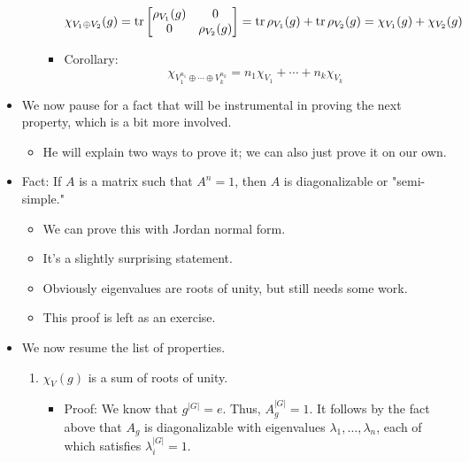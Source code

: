 \documentclass[../notes.tex]{subfiles}
\begin{document}
\begin{itemize}
\begin{enumerate}
\begin{itemize}
            \begin{equation*}
                \chi_{V_1\oplus V_2}(g) = \tr
                \begin{bmatrix}
                    \rho_{V_1}(g) & 0\\
                    0 & \rho_{V_2}(g)\\
                \end{bmatrix}
                = \tr\rho_{V_1}(g)+\tr\rho_{V_2}(g)
                = \chi_{V_1}(g)+\chi_{V_2}(g)
            \end{equation*}
            \item Corollary:
            \begin{equation*}
                \chi_{V_1^{n_1}\oplus\cdots\oplus V_k^{n_k}} = n_1\chi_{V_1}+\cdots+n_k\chi_{V_k}
            \end{equation*}
        \end{itemize}
    \end{enumerate}
    \item We now pause for a fact that will be instrumental in proving the next property, which is a bit more involved.
    \begin{itemize}
        \item He will explain two ways to prove it; we can also just prove it on our own.
    \end{itemize}
    \item Fact: If $A$ is a matrix such that $A^n=1$, then $A$ is diagonalizable or "semi-simple."
    \begin{itemize}
        \item We can prove this with Jordan normal form.
        \item It's a slightly surprising statement.
        \item Obviously eigenvalues are roots of unity, but still needs some work.
        \item This proof is left as an exercise.
    \end{itemize}
    \item We now resume the list of properties.
    \begin{enumerate}[resume]
        \item $\chi_V(g)$ is a sum of roots of unity.
        \begin{itemize}
            \item Proof: We know that $g^{|G|}=e$. Thus, $A_g^{|G|}=1$. It follows by the fact above that $A_g$ is diagonalizable with eigenvalues $\lambda_1,\dots,\lambda_n$, each of which satisfies $\lambda_i^{|G|}=1$.

\end{itemize}
\end{enumerate}
\end{itemize}
\end{document}
